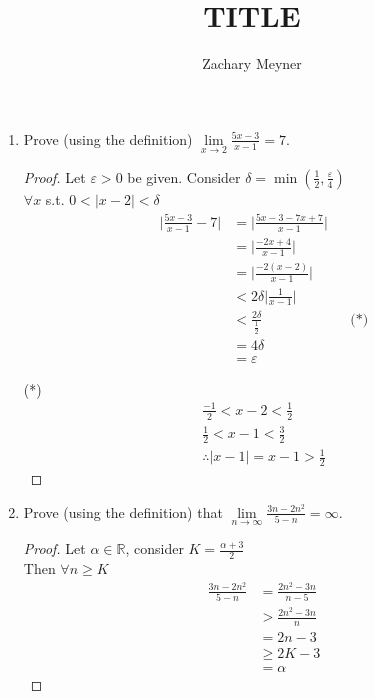 \documentclass[12pt]{article}
\title{\large TITLE}
\author{\large Zachary Meyner}
\date{}
\begin{document}
\maketitle

\begin{enumerate}
    \item Prove (using the definition) $\lim\limits_{x \to 2} \frac{5x-3}{x-1} = 7$.
    \begin{proof}
        Let $\varepsilon > 0$ be given. Consider $\delta = \min(\frac{1}{2}, \frac{\varepsilon}{4})$ \\
        $\forall x$ s.t. $0 < |x-2| < \delta$
        \begin{align*}
            \bigg| \frac{5x-3}{x-1} - 7 \bigg| &= \bigg| \frac{5x-3-7x+7}{x-1} \bigg| \\
            &= \bigg| \frac{-2x+4}{x-1} \bigg| \\
            &= \bigg| \frac{-2(x-2)}{x-1} \bigg| \\
            &< 2\delta \bigg| \frac{1}{x-1} \bigg| \\
            &< \frac{2\delta}{\frac{1}{2}} && \text{(*)} \\
            &= 4\delta \\
            &= \varepsilon
        \end{align*}

        (*)
        \begin{gather*}
            \frac{-1}{2} < x-2 < \frac{1}{2}\\
            \frac{1}{2} < x-1 < \frac{3}{2} \\
            \therefore |x-1| = x-1 > \frac{1}{2}
        \end{gather*}
    \end{proof}

    \item Prove (using the definition) that $\lim\limits_{n \to \infty} \frac{3n-2n^2}{5-n} = \infty$.
    \begin{proof}
        Let $\alpha \in \mathbb{R}$, consider $K = \frac{\alpha+3}{2}$ \\
        Then $\forall n \geq K$
        \begin{align*}
            \frac{3n-2n^2}{5-n} &= \frac{2n^2-3n}{n-5} \\
            &> \frac{2n^2-3n}{n} \\
            &= 2n-3 \\
            &\geq 2K-3 \\
            &= \alpha
        \end{align*}
    \end{proof}


\end{enumerate}
\end{document}
